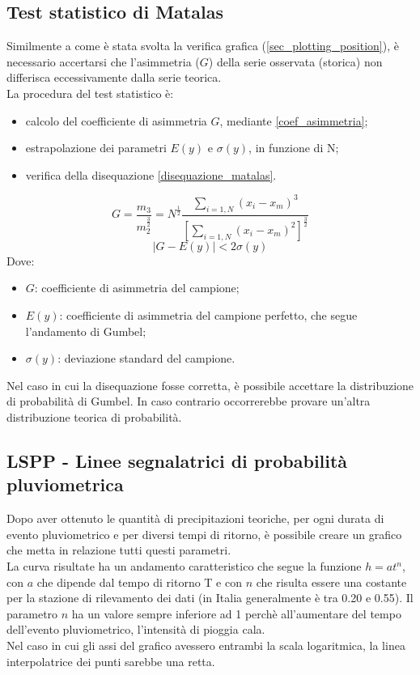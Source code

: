\subsection{Test statistico di Matalas}
Similmente a come è stata svolta la verifica grafica (\ref{sec_plotting_position}), è necessario accertarsi che l'asimmetria ($G$) della serie osservata (storica) non differisca eccessivamente dalla serie teorica.\\
La procedura del test statistico è:
\begin{itemize}
\item calcolo del coefficiente di asimmetria $G$, mediante \ref{coef_asimmetria};
\item estrapolazione dei parametri $E(y)$ e $\sigma(y)$, in funzione di N;
\item verifica della disequazione \ref{disequazione_matalas}.
\end{itemize}
\begin{equation}
    G = \frac{m_3}{m_2^{\frac{3}{2}}} = N^{\frac{1}{2}} \frac{\sum_{i=1,N}(x_i - x_m)^3}{\left[\sum_{i=1,N}(x_i-x_m)^2\right]^{\frac{3}{2}}}
    \label{coef_asimmetria}
\end{equation}
\begin{equation}
    |G - E (y)| < 2 \sigma(y)
    \label{disequazione_matalas}
\end{equation}
\noindent Dove:
\begin{itemize}
    \item $G$: coefficiente di asimmetria del campione;
    \item $E(y)$: coefficiente di asimmetria del campione perfetto, che segue l'andamento di Gumbel;
    \item $\sigma (y)$: deviazione standard del campione.
\end{itemize}
Nel caso in cui la disequazione fosse corretta, è possibile accettare la distribuzione di probabilità di Gumbel. In caso contrario occorrerebbe provare un'altra distribuzione teorica di probabilità.

\subsection{LSPP - Linee segnalatrici di probabilità pluviometrica}
Dopo aver ottenuto le quantità di precipitazioni teoriche, per ogni durata di evento pluviometrico e per diversi tempi di ritorno, è possibile creare un grafico che metta in relazione tutti questi parametri.\\
La curva risultate ha un andamento caratteristico che segue la funzione $h=at^n$, con $a$ che dipende dal tempo di ritorno T e con $n$ che risulta essere una costante per la stazione di rilevamento dei dati (in Italia generalmente è tra 0.20 e 0.55). Il parametro $n$ ha un valore sempre inferiore ad 1 perchè all'aumentare del tempo dell'evento pluviometrico, l'intensità di pioggia cala.\\
Nel caso in cui gli assi del grafico avessero entrambi la scala logaritmica, la linea interpolatrice dei punti sarebbe una retta.